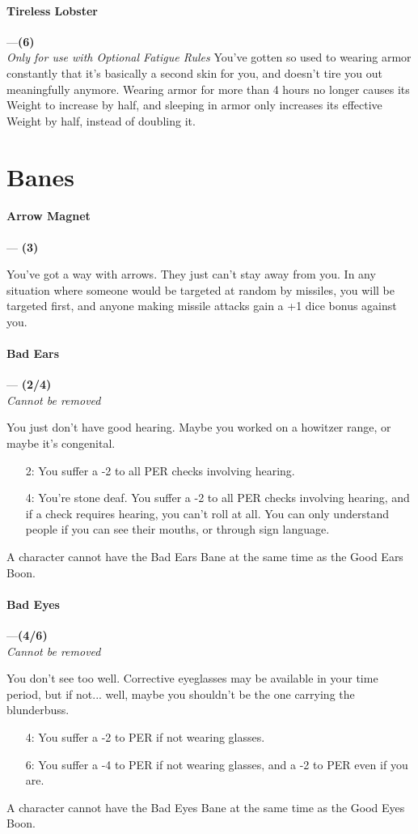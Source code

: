 \documentclass[oneside,11pt,english]{book}
\begin{document}
\paragraph{\label{boon:Tireless Lobster}Tireless Lobster}---\quad\textbf{(6)}\\
\textit{Only for use with Optional Fatigue Rules}
You’ve gotten so used to wearing armor constantly that it’s basically a second skin for you, and doesn’t tire you out meaningfully anymore. Wearing armor for more than 4 hours no longer causes its Weight to increase by half, and sleeping in armor only increases its effective Weight by half, instead of doubling it.

\section{Banes}
\paragraph{\label{bane:Arrow Magnet}Arrow Magnet}---\quad\textbf{ (3)}\par
You've got a way with arrows. They just can't stay away from you. In any situation where someone would 
be targeted at random by missiles, you will be targeted first, and anyone making missile attacks gain a +1 dice bonus against you. 
\paragraph{\label{bane:Bad Ears}Bad Ears}---\quad\textbf{ (2/4)}\\
\textit{Cannot be removed}\par
You just don't have good hearing. Maybe you worked on a howitzer range, or maybe it's congenital. 
\begin{itemize}
	\item [2:] You suffer a -2 to all PER checks involving hearing. 
	\item [4:] You're stone deaf. You suffer a -2 to all PER checks involving hearing, and if a check requires hearing, 
you can't roll at all. You can only understand people if you can see their mouths, or through sign 
language. 
\end{itemize}
A character cannot have the Bad Ears Bane at the same time as the Good Ears Boon. 
\paragraph{\label{bane:Bad Eyes}Bad Eyes}---\quad\textbf{(4/6)}\\
\textit{Cannot be removed}\par
You don't see too well. Corrective eyeglasses may be available in your time period, but if not... well, 
maybe you shouldn't be the one carrying the blunderbuss. 
\begin{itemize}
\item [4:] You suffer a -2 to PER if not wearing glasses. 
\item [6:] You suffer a -4 to PER if not wearing glasses, and a -2 to PER even if you are. 
\end{itemize}
A character cannot have the Bad Eyes Bane at the same time as the Good Eyes Boon. 
\end{document}
